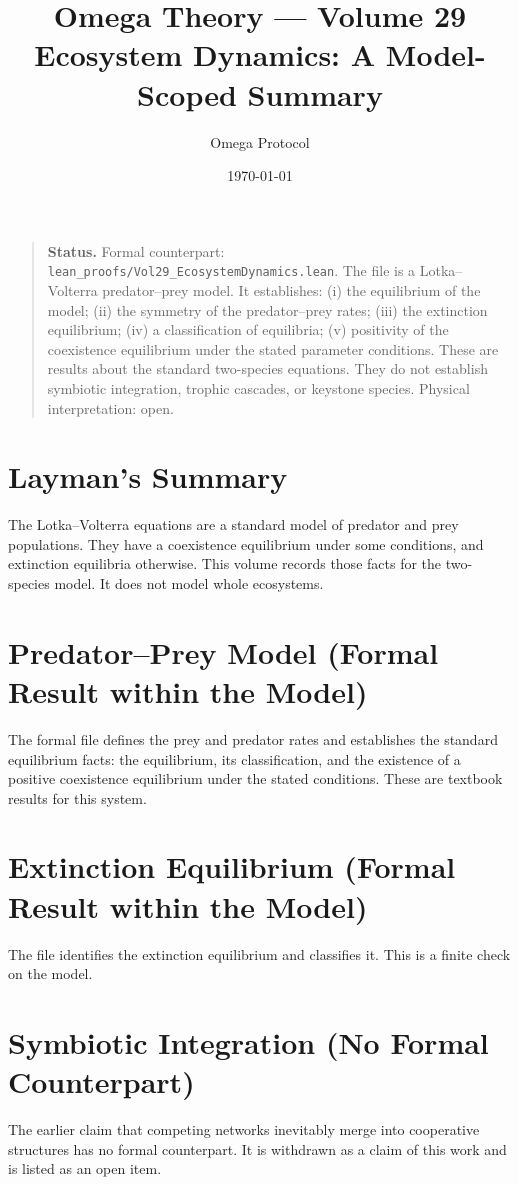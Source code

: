 \documentclass[11pt, a4paper]{article}
\title{Omega Theory --- Volume 29\\\Large Ecosystem Dynamics: A Model-Scoped Summary}
\author{Omega Protocol}
\date{\today}
\begin{document}
\maketitle

\begin{quote}
\textbf{Status.} Formal counterpart: \texttt{lean\_proofs/Vol29\_EcosystemDynamics.lean}. The file is a Lotka--Volterra predator--prey model. It establishes: (i) the equilibrium of the model; (ii) the symmetry of the predator--prey rates; (iii) the extinction equilibrium; (iv) a classification of equilibria; (v) positivity of the coexistence equilibrium under the stated parameter conditions. These are results about the standard two-species equations. They do not establish symbiotic integration, trophic cascades, or keystone species. Physical interpretation: open.
\end{quote}

\section*{Layman's Summary}
The Lotka--Volterra equations are a standard model of predator and prey populations. They have a coexistence equilibrium under some conditions, and extinction equilibria otherwise. This volume records those facts for the two-species model. It does not model whole ecosystems.

\section{Predator--Prey Model (Formal Result within the Model)}
The formal file defines the prey and predator rates and establishes the standard equilibrium facts: the equilibrium, its classification, and the existence of a positive coexistence equilibrium under the stated conditions. These are textbook results for this system.

\section{Extinction Equilibrium (Formal Result within the Model)}
The file identifies the extinction equilibrium and classifies it. This is a finite check on the model.

\section{Symbiotic Integration (No Formal Counterpart)}
The earlier claim that competing networks inevitably merge into cooperative structures has no formal counterpart. It is withdrawn as a claim of this work and is listed as an open item.
\end{document}
